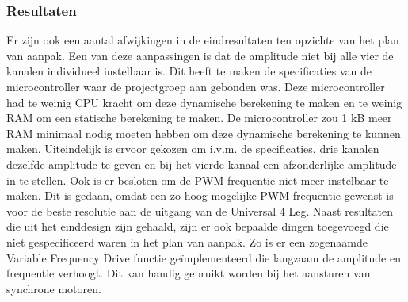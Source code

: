 \subsubsection{Resultaten}
Er zijn ook een aantal afwijkingen in de eindresultaten ten opzichte van het plan van aanpak. Een van deze aanpassingen is dat de amplitude niet bij alle vier de kanalen individueel instelbaar is. Dit heeft te maken de specificaties van de microcontroller waar de projectgroep aan gebonden was. Deze microcontroller had te weinig CPU kracht om deze dynamische berekening te maken en te weinig RAM om een statische berekening te maken. De microcontroller zou 1 kB meer RAM minimaal nodig moeten hebben om deze dynamische berekening te kunnen maken. Uiteindelijk is ervoor gekozen om i.v.m. de specificaties, drie kanalen dezelfde amplitude te geven en bij het vierde kanaal een afzonderlijke amplitude in te stellen. Ook is er besloten om de PWM frequentie niet meer instelbaar te maken. Dit is gedaan, omdat een zo hoog mogelijke PWM frequentie gewenst is voor de beste resolutie aan de uitgang van de Universal 4 Leg. Naast resultaten die uit het einddesign zijn gehaald, zijn er ook bepaalde dingen toegevoegd die niet gespecificeerd waren in het plan van aanpak. Zo is er een zogenaamde Variable Frequency Drive functie geïmplementeerd die langzaam de amplitude en frequentie verhoogt. Dit kan handig gebruikt worden bij het aansturen van synchrone motoren.
